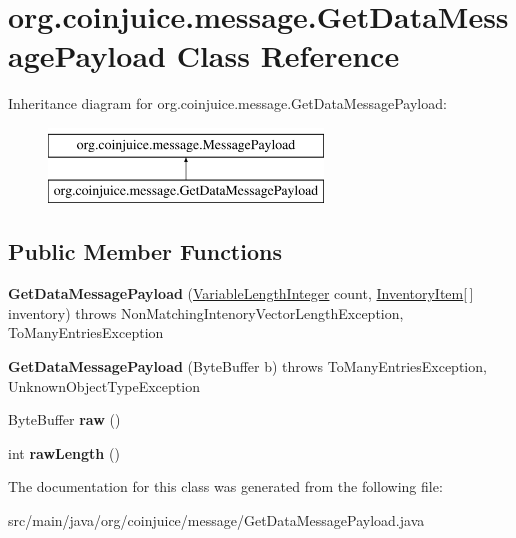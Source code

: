 \hypertarget{classorg_1_1coinjuice_1_1message_1_1_get_data_message_payload}{\section{org.\-coinjuice.\-message.\-Get\-Data\-Message\-Payload Class Reference}
\label{classorg_1_1coinjuice_1_1message_1_1_get_data_message_payload}
}
Inheritance diagram for org.\-coinjuice.\-message.\-Get\-Data\-Message\-Payload\-:\begin{figure}[H]
\begin{center}
\leavevmode
\includegraphics[height=2.000000cm]{classorg_1_1coinjuice_1_1message_1_1_get_data_message_payload}
\end{center}
\end{figure}
\subsection*{Public Member Functions}
\begin{DoxyCompactItemize}
\item 
\hypertarget{classorg_1_1coinjuice_1_1message_1_1_get_data_message_payload_af492bb7dc0074483d8a8cff1b9095308}{{\bfseries Get\-Data\-Message\-Payload} (\hyperlink{classorg_1_1coinjuice_1_1message_1_1field_1_1_variable_length_integer}{Variable\-Length\-Integer} count, \hyperlink{classorg_1_1coinjuice_1_1message_1_1field_1_1_inventory_item}{Inventory\-Item}\mbox{[}$\,$\mbox{]} inventory)  throws Non\-Matching\-Intenory\-Vector\-Length\-Exception, To\-Many\-Entries\-Exception }\label{classorg_1_1coinjuice_1_1message_1_1_get_data_message_payload_af492bb7dc0074483d8a8cff1b9095308}

\item 
\hypertarget{classorg_1_1coinjuice_1_1message_1_1_get_data_message_payload_ac919add49179c9ba91e5c3bfc8cc3d81}{{\bfseries Get\-Data\-Message\-Payload} (Byte\-Buffer b)  throws To\-Many\-Entries\-Exception, Unknown\-Object\-Type\-Exception }\label{classorg_1_1coinjuice_1_1message_1_1_get_data_message_payload_ac919add49179c9ba91e5c3bfc8cc3d81}

\item 
\hypertarget{classorg_1_1coinjuice_1_1message_1_1_get_data_message_payload_a4c9a4038d5dfe267aee3b81385edbdd5}{Byte\-Buffer {\bfseries raw} ()}\label{classorg_1_1coinjuice_1_1message_1_1_get_data_message_payload_a4c9a4038d5dfe267aee3b81385edbdd5}

\item 
\hypertarget{classorg_1_1coinjuice_1_1message_1_1_get_data_message_payload_ab0c0921901ce9dec8955f37eeb413e2c}{int {\bfseries raw\-Length} ()}\label{classorg_1_1coinjuice_1_1message_1_1_get_data_message_payload_ab0c0921901ce9dec8955f37eeb413e2c}

\end{DoxyCompactItemize}


The documentation for this class was generated from the following file\-:\begin{DoxyCompactItemize}
\item 
src/main/java/org/coinjuice/message/Get\-Data\-Message\-Payload.\-java\end{DoxyCompactItemize}
